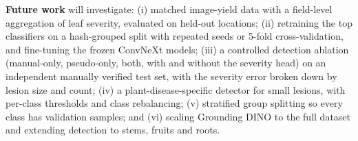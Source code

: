 \textbf{Future work} will investigate:
(i) matched image-yield data with a field-level aggregation of leaf
severity, evaluated on held-out locations;
(ii) retraining the top classifiers on a hash-grouped split with
repeated seeds or 5-fold cross-validation, and fine-tuning the frozen
ConvNeXt models;
(iii) a controlled detection ablation (manual-only, pseudo-only, both,
with and without the severity head) on an independent manually verified
test set, with the severity error broken down by lesion size and count;
(iv) a plant-disease-specific detector for small lesions, with
per-class thresholds and class rebalancing;
(v) stratified group splitting so every class has validation samples;
and
(vi) scaling Grounding DINO to the full dataset and extending detection
to stems, fruits and roots.
